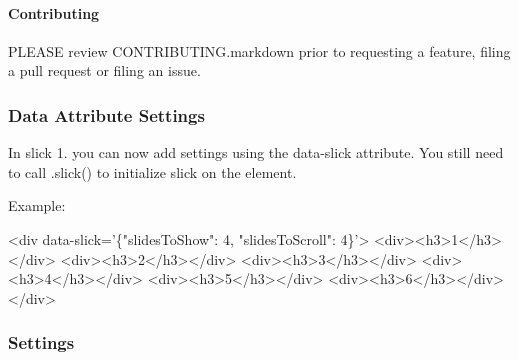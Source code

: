 \paragraph*{Contributing}

P\+L\+E\+A\+SE review C\+O\+N\+T\+R\+I\+B\+U\+T\+I\+N\+G.\+markdown prior to requesting a feature, filing a pull request or filing an issue.

\subsubsection*{Data Attribute Settings}

In slick 1. you can now add settings using the data-\/slick attribute. You still need to call .slick() to initialize slick on the element.

Example\+:


\begin{DoxyCode}
<div data-slick='\{"slidesToShow": 4, "slidesToScroll": 4\}'>
  <div><h3>1</h3></div>
  <div><h3>2</h3></div>
  <div><h3>3</h3></div>
  <div><h3>4</h3></div>
  <div><h3>5</h3></div>
  <div><h3>6</h3></div>
</div>
\end{DoxyCode}


\subsubsection*{Settings}

